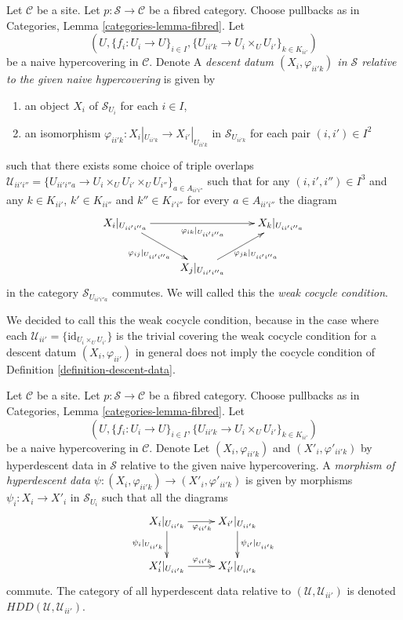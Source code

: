 \begin{definition}
\label{definition-hyperdescent-data}
Let $\mathcal{C}$ be a site.
Let $p : \mathcal{S} \to \mathcal{C}$ be a fibred category.
Choose pullbacks as in Categories, Lemma \ref{categories-lemma-fibred}.
Let
$$
(U, \{f_i : U_i \to U\}_{i \in I},
\{U_{ii'k} \to U_i \times_U U_{i'}\}_{k \in K_{ii'}})
$$
be a naive hypercovering in $\mathcal{C}$. Denote
A {\it descent datum $(X_i, \varphi_{ii'k})$ in $\mathcal{S}$
relative to the given naive hypercovering} is given by
\begin{enumerate}
\item an object $X_i$ of $\mathcal{S}_{U_i}$ for each $i \in I$,
\item an isomorphism $\varphi_{ii'k} : X_i|_{U_{ii'k}} \to X_{i'}|_{U_{ii'k}}$
in $\mathcal{S}_{U_{ii'k}}$ for each pair $(i, i') \in I^2$
\end{enumerate}
such that there exists some choice of triple overlaps
$\mathcal{U}_{ii'i''} =
\{U_{ii'i''a} \to U_i \times_U U_{i'} \times_U U_{i''}\}_{a \in A_{ii'i''}}$
such that for any $(i, i', i'') \in I^3$ and
any $k \in K_{ii'}$, $k' \in K_{ii''}$ and $k'' \in K_{i'i''}$
for every $a \in A_{ii'i''}$ the diagram
$$
\xymatrix{
X_i|_{U_{ii'i''a}} \ar[rd]_{\varphi_{ij}|_{U_{ii'i''a}}}
\ar[rr]_{\varphi_{ik}|_{U_{ii'i''a}}} & &
X_k|_{U_{ii'i''a}} \\
&
X_j|_{U_{ii'i''a}} \ar[ru]_{\varphi_{jk}|_{U_{ii'i''a}}} &
}
$$
in the category $\mathcal{S}_{U_{ii'i''a}}$
commutes. We will called this the {\it weak cocycle condition}.
\end{definition}

\noindent
We decided to call this the weak cocycle condition, because
in the case where each
$\mathcal{U}_{ii'} = \{\text{id}_{U_i \times_U U_{i'}}\}$
is the trivial covering
the weak cocycle condition for a descent datum
$(X_i , \varphi_{ii'})$
in general does not imply the cocycle condition of
Definition \ref{definition-descent-data}.

\begin{definition}
\label{definition-morphism-hyperdescent-data}
Let $\mathcal{C}$ be a site.
Let $p : \mathcal{S} \to \mathcal{C}$ be a fibred category.
Choose pullbacks as in Categories, Lemma \ref{categories-lemma-fibred}.
Let
$$
(U, \{f_i : U_i \to U\}_{i \in I},
\{U_{ii'k} \to U_i \times_U U_{i'}\}_{k \in K_{ii'}})
$$
be a naive hypercovering in $\mathcal{C}$. Denote
Let $(X_i, \varphi_{ii'k})$ and $(X'_i, \varphi'_{ii'k})$
by hyperdescent data in $\mathcal{S}$
relative to the given naive hypercovering.
A {\it morphism of hyperdescent data}
$\psi : (X_i, \varphi_{ii'k}) \to (X'_i, \varphi'_{ii'k})$
is given by morphisms $\psi_i : X_i \to X'_i$ in $\mathcal{S}_{U_i}$
such that all the diagrams
$$
\xymatrix{
X_i|_{U_{ii'k}}
\ar[r]_{\varphi_{ii'k}}
\ar[d]_{\psi_i|_{U_{ii'k}}} &
X_{i'}|_{U_{ii'k}}
\ar[d]^{\psi_{i'}|_{U_{ii'k}}}
\\
X'_i|_{U_{ii'k}}
\ar[r]^{\varphi_{ii'k}}
&
X'_{i'}|_{U_{ii'k}}
}
$$
commute. The category of all hyperdescent data relative to
$(\mathcal{U}, \mathcal{U}_{ii'})$ is denoted
$HDD(\mathcal{U}, \mathcal{U}_{ii'})$.
\end{definition}

